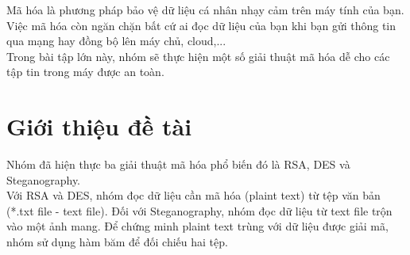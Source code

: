 \documentclass[a4paper]{article}
\begin{document}

\newpage
\tableofcontents
\newpage

Mã hóa là phương pháp bảo vệ dữ liệu cá nhân nhạy cảm trên máy tính của bạn. Việc mã hóa còn ngăn chặn bất cứ ai đọc dữ liệu của bạn khi bạn gửi thông tin qua mạng hay đồng bộ lên máy chủ, cloud,...\\

Trong bài tập lớn này, nhóm sẽ thực hiện một số giải thuật mã hóa dễ cho các tập tin trong máy được an toàn.

\section{Giới thiệu đề tài}
Nhóm đã hiện thực ba giải thuật mã hóa phổ biến đó là RSA, DES và Steganography.\\

Với RSA và DES, nhóm đọc dữ liệu cần mã hóa (plaint text) từ tệp văn bản (*.txt file - text file). Đối với Steganography, nhóm đọc dữ liệu từ text file trộn vào một ảnh mang.
Để chứng minh plaint text trùng với dữ liệu được giải mã, nhóm sử dụng hàm băm để đối chiếu hai tệp.

\end{document}
